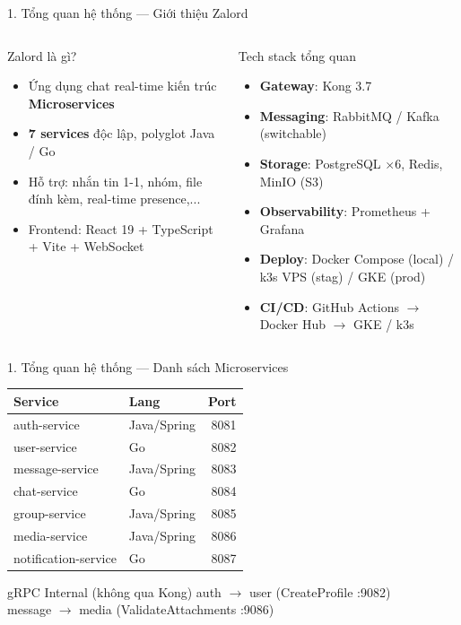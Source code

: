 \documentclass[aspectratio=169,compress]{beamer}
\begin{document}
\begin{frame}{1. Tổng quan hệ thống --- Giới thiệu Zalord}
\begin{columns}[T]
\begin{block}{Zalord là gì?}
\begin{itemize}
  \item Ứng dụng chat real-time kiến trúc \textbf{Microservices}
  \item \textbf{7 services} độc lập, polyglot Java / Go
  \item Hỗ trợ: nhắn tin 1-1, nhóm, file đính kèm, real-time presence,...
  \item Frontend: React 19 + TypeScript + Vite + WebSocket
\end{itemize}
\end{block}

\begin{block}{Tech stack tổng quan}
\begin{itemize}
  \item \textbf{Gateway}: Kong 3.7
  \item \textbf{Messaging}: RabbitMQ / Kafka (switchable)
  \item \textbf{Storage}: PostgreSQL $\times$6, Redis, MinIO (S3)
  \item \textbf{Observability}: Prometheus + Grafana
  \item \textbf{Deploy}: Docker Compose (local) / k3s VPS (stag) / GKE (prod)
  \item \textbf{CI/CD}: GitHub Actions $\rightarrow$ Docker Hub $\rightarrow$ GKE / k3s
\end{itemize}
\end{block}
\end{columns}
\end{frame}

\begin{frame}{1. Tổng quan hệ thống --- Danh sách Microservices}
\begin{table}[h]
\centering
\begin{tabular}{|l|l|r|}
\hline
\textbf{Service} & \textbf{Lang} & \textbf{Port} \\
\hline
auth-service & Java/Spring & 8081 \\
user-service & Go & 8082 \\
message-service & Java/Spring & 8083 \\
chat-service & Go & 8084 \\
group-service & Java/Spring & 8085 \\
media-service & Java/Spring & 8086 \\
notification-service & Go & 8087 \\
\hline
\end{tabular}
\end{table}

\vspace{0.2cm}
\begin{alertblock}{gRPC Internal (không qua Kong)}
auth $\rightarrow$ user (CreateProfile :9082) \\
message $\rightarrow$ media (ValidateAttachments :9086)
\end{alertblock}
\end{frame}
\end{document}
